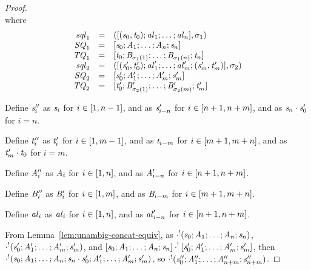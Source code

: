 \documentclass[numbers]{sigplanconf}
\begin{document}
\begin{proof}
\[{    }
  \]
  where
  \[
    \begin{array}{rcl}
      \mathit{sql}_1 & = &
                            ([(\mathit{s}_0,\mathit{t}_0);\mathit{al}_1;\ldots;\mathit{al}_n],
                            \sigma_1)\\
      \mathit{SQ}_1 & = &
                        [\mathit{s}_0;\mathit{A}_1;\ldots;\mathit{A}_n;\mathit{s}_n]\\
      \mathit{TQ}_1 & = &
                           [\mathit{t}_0;\mathit{B}_{\sigma_1(1)};\ldots;\mathit{B}_{\sigma_1(n)};\mathit{t}_n]\\
      \mathit{sql}_2 & = &
                            ([(\mathit{s}_0',\mathit{t}_0');\mathit{al}_1';\ldots;\mathit{al}_m';(\mathit{s}_m',\mathit{t}_m')],\sigma_2)\\
      \mathit{SQ}_2 & = &
                        [\mathit{s}_0';\mathit{A}_1';\ldots;\mathit{A}_m';\mathit{s}_m']\\
      \mathit{TQ}_2 & = &
                           [\mathit{t}_0';\mathit{B}_{\sigma_2(1)}';\ldots;\mathit{B}_{\sigma_2(m)}';\mathit{t}_m']
    \end{array}
  \]

  Define $\mathit{s}_i''$ as $\mathit{s}_i$ for $i \in [1,n-1]$, and as
  $\mathit{s}_{i-n}'$ for $i \in [n+1,n+m]$, and as
  $\mathit{s}_n\cdot\mathit{s}_0'$ for $i=n$.
  
  Define $\mathit{t}_i''$ as $\mathit{t}_i'$ for $i \in [1,m-1]$,
  and as $\mathit{t}_{i-m}$ for $i \in
  [m+1,m+n]$, and as $\mathit{t}_m'\cdot\mathit{t}_0$ for $i=m$.
  
  Define $\mathit{A}_i''$ as $\mathit{A}_i$ for $i \in [1,n]$, and as
  $\mathit{A}_{i-n}'$ for $i \in [n+1,n+m]$.
  
  Define $\mathit{B}_i''$ as $\mathit{B}_i'$ for $i \in [1,m]$, and as
  $\mathit{B}_{i-m}$ for $i \in [m+1,m+n]$.
  
  Define $\mathit{al}_i$ as $\mathit{al}_i$ for $i \in [1,n]$, and as
  $\mathit{al}_{i-n}'$ for $i \in [n+1,n+m]$.
  
  From Lemma~\ref{lem:unambig-concat-equiv}, as
  $\cdot^!(\mathit{s}_0;\mathit{A}_1;\ldots;\mathit{A}_n;\mathit{s}_n)$,
  $\cdot^!(\mathit{s}_0';\mathit{A}_1';\ldots;\mathit{A}_m';\mathit{s}_m')$,
  and
  $[\mathit{s}_0;\mathit{A}_1;\ldots;\mathit{A}_n;\mathit{s}_n] \cdot^! [\mathit{s}_0';\mathit{A}_1';\ldots;\mathit{A}_m';\mathit{s}_m']$,
  then $\cdot^!(\mathit{s}_0;\mathit{A}_1;\ldots;\mathit{A}_n;
    \mathit{s}_n\cdot\mathit{s}_0';
    \mathit{A}_1';\ldots;\mathit{A}_m';\mathit{s}_m')$, so
  $\cdot^!(\mathit{s}_0'';\mathit{A}_1'';\ldots;\mathit{A}_{n+m}'';\mathit{s}_{n+m}'')$.


\end{proof}
\end{document}
